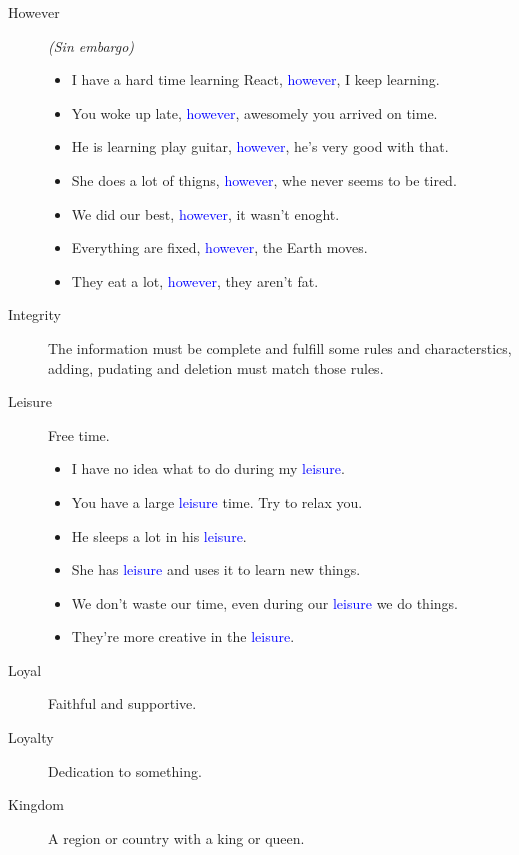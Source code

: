 \begin{multicols}{2}
\begin{description}
\item[However] \emph{(Sin embargo)}
\begin{itemize}
\item I have a hard time learning React, \textcolor{blue}{however}, I keep learning.
\item You woke up late, \textcolor{blue}{however}, awesomely you arrived on time.
\item He is learning play guitar, \textcolor{blue}{however}, he's very good with that.
\item She does a lot of thigns, \textcolor{blue}{however}, whe never seems to be tired.
\item We did our best, \textcolor{blue}{however}, it wasn't enoght.
\item Everything are fixed, \textcolor{blue}{however}, the Earth moves.
\item They eat a lot, \textcolor{blue}{however}, they aren't fat.
\end{itemize}

\item[Integrity] The information must be complete and fulfill some rules and characterstics, adding, pudating and deletion must match those rules.

\item[Leisure] Free time.
\begin{itemize}
\item I have no idea what to do during my \textcolor{blue}{leisure}.
\item You have a large \textcolor{blue}{leisure} time. Try to relax you.
\item He sleeps a lot in his \textcolor{blue}{leisure}.
\item She has \textcolor{blue}{leisure} and uses it to learn new things.
\item We don't waste our time, even during our \textcolor{blue}{leisure} we do things.
\item They're more creative in the \textcolor{blue}{leisure}.
\end{itemize}

\item[Loyal] Faithful and supportive.

\item[Loyalty]Dedication to something.

\item[Kingdom] A region or country with a king or queen.


\end{description}
\end{multicols}
